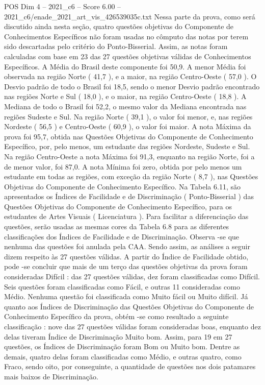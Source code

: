 \begin{textsample}{POS Dim 4 – 2021\_c6 – Score 6.00 – 2021\_c6/enade\_2021\_art\_vis\_426539035c.txt}
Nessa parte da prova, como será discutido ainda nesta seção, quatro questões objetivas do Componente de Conhecimentos Específicos não foram usadas no cômputo das notas por terem sido descartadas pelo critério do Ponto-Bisserial.
Assim, as notas foram calculadas com base em 23 das 27 questões objetivas válidas de Conhecimentos Específicos.
A Média do Brasil deste componente foi 50,9.
A menor Média foi observada na região Norte ( 41,7 ), e a maior, na região Centro-Oeste ( 57,0 ).
O Desvio padrão de todo o Brasil foi 18,5, sendo o menor Desvio padrão encontrado nas regiões Norte e Sul ( 18,0 ), e o maior, na região Centro-Oeste ( 18,8 ).
A Mediana de todo o Brasil foi 52,2, o mesmo valor da Mediana encontrada nas regiões Sudeste e Sul.
Na região Norte ( 39,1 ), o valor foi menor, e, nas regiões Nordeste ( 56,5 ) e Centro-Oeste ( 60,9 ), o valor foi maior.
A nota Máxima da prova foi 95,7, obtida nas Questões Objetivas do Componente de Conhecimento Específico, por, pelo menos, um estudante das regiões Nordeste, Sudeste e Sul.
Na região Centro-Oeste a nota Máxima foi 91,3, enquanto na região Norte, foi a de menor valor, foi 87,0.
A nota Mínima foi zero, obtida por pelo menos um estudante em todas as regiões, com exceção da região Norte ( 8,7 ), nas Questões Objetivas do Componente de Conhecimento Específico.
Na Tabela 6.11, são apresentados os Índices de Facilidade e de Discriminação ( Ponto-Bisserial ) das Questões Objetivas do Componente de Conhecimento Específico, para os estudantes de Artes Visuais ( Licenciatura ).
Para facilitar a diferenciação das questões, serão usadas as mesmas cores da Tabela 6.8 para as diferentes classificações dos Índices de Facilidade e de Discriminação.
Observa -se que nenhuma das questões foi anulada pela CAA.
Sendo assim, as análises a seguir dizem respeito às 27 questões válidas.
A partir do Índice de Facilidade obtido, pode -se concluir que mais de um terço das questões objetivas da prova foram consideradas Difícil : das 27 questões válidas, dez foram classificadas como Difícil.
Seis questões foram classificadas como Fácil, e outras 11 consideradas como Médio.
Nenhuma questão foi classificada como Muito fácil ou Muito difícil.
Já quanto aos Índices de Discriminação das Questões Objetivas do Componente de Conhecimento Específico da prova, obtém -se como resultado a seguinte classificação : nove das 27 questões válidas foram consideradas boas, enquanto dez delas tiveram Índice de Discriminação Muito bom.
Assim, para 19 em 27 questões, os Índices de Discriminação foram Bom ou Muito bom.
Dentre as demais, quatro delas foram classificadas como Médio, e outras quatro, como Fraco, sendo oito, por conseguinte, a quantidade de questões nos dois patamares mais baixos de Discriminação.

\end{textsample}
